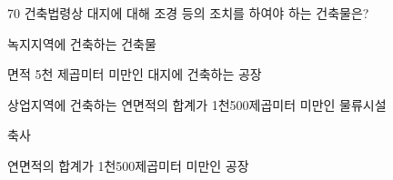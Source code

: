 \begin{question}{70}
건축법령상 대지에 대해 조경 등의 조치를 하여야 하는 건축물은?
\begin{choices}
  \item 녹지지역에 건축하는 건축물
  \item 면적 5천 제곱미터 미만인 대지에 건축하는 공장
  \item 상업지역에 건축하는 연면적의 합계가 1천500제곱미터 미만인 물류시설
  \item 축사
  \item 연면적의 합계가 1천500제곱미터 미만인 공장
\end{choices}
\end{question}
